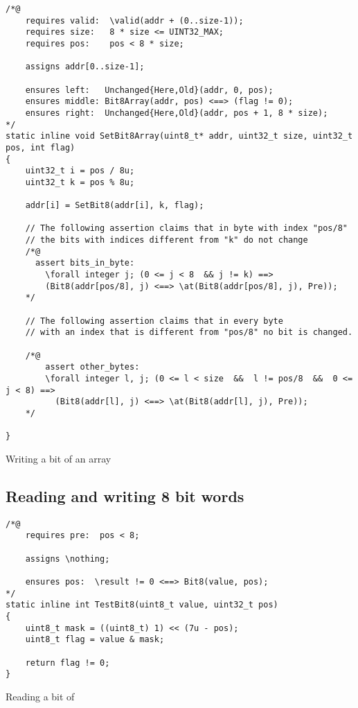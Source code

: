 \begin{listing}[hbt]
\begin{minipage}{0.99\textwidth}
\begin{lstlisting}[style=acsl-block]
/*@
    requires valid:  \valid(addr + (0..size-1));
    requires size:   8 * size <= UINT32_MAX;
    requires pos:    pos < 8 * size;

    assigns addr[0..size-1];

    ensures left:   Unchanged{Here,Old}(addr, 0, pos);
    ensures middle: Bit8Array(addr, pos) <==> (flag != 0);
    ensures right:  Unchanged{Here,Old}(addr, pos + 1, 8 * size);
*/
static inline void SetBit8Array(uint8_t* addr, uint32_t size, uint32_t pos, int flag)
{
    uint32_t i = pos / 8u;
    uint32_t k = pos % 8u;

    addr[i] = SetBit8(addr[i], k, flag);

    // The following assertion claims that in byte with index "pos/8"
    // the bits with indices different from "k" do not change
    /*@
      assert bits_in_byte:
        \forall integer j; (0 <= j < 8  && j != k) ==>
        (Bit8(addr[pos/8], j) <==> \at(Bit8(addr[pos/8], j), Pre));
    */

    // The following assertion claims that in every byte
    // with an index that is different from "pos/8" no bit is changed.

    /*@
        assert other_bytes:
        \forall integer l, j; (0 <= l < size  &&  l != pos/8  &&  0 <= j < 8) ==>
          (Bit8(addr[l], j) <==> \at(Bit8(addr[l], j), Pre));
    */

}
\end{lstlisting}
\end{minipage}
\caption{\label{lst:SetBit8Array}Writing a bit of an  array}
\end{listing}


\clearpage

\subsection{Reading and writing 8 bit words}
\label{subsec:low-level 8}


\begin{listing}[hbt]
\begin{minipage}{0.99\textwidth}
\begin{lstlisting}[style=acsl-block]
/*@
    requires pre:  pos < 8;

    assigns \nothing;

    ensures pos:  \result != 0 <==> Bit8(value, pos);
*/
static inline int TestBit8(uint8_t value, uint32_t pos)
{
    uint8_t mask = ((uint8_t) 1) << (7u - pos);
    uint8_t flag = value & mask;

    return flag != 0;
}
\end{lstlisting}
\end{minipage}
\caption{\label{lst:TestBit8}Reading a bit of }
\end{listing}


